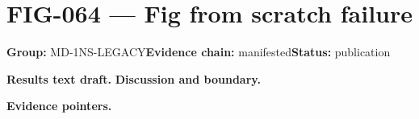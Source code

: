 \clearpage
\section{FIG-064 --- Fig from scratch failure}
\label{figpage:fig-064}
\textbf{Group:} MD-1NS-LEGACY\quad \textbf{Evidence chain:} manifested\quad \textbf{Status:} publication

\textbf{Results text draft.} 
\textbf{Discussion and boundary.} 


\textbf{Evidence pointers.}



\vfill
